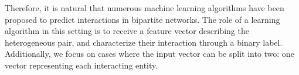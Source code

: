 
Therefore, it is natural that numerous machine learning algorithms have been proposed to predict interactions in bipartite networks. 
The role of a learning algorithm in this setting is to receive a feature vector describing the heterogeneous pair, and characterize their interaction through a binary label.
Additionally, we focus on cases where the input vector can be split into two: one vector representing each interacting entity.
%


